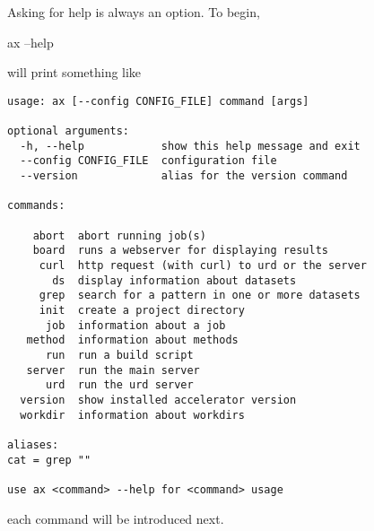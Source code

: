 Asking for help is always an option.  To begin,
\begin{shell}
ax --help
\end{shell}
will print something like
\begin{snugshade}
\begin{verbatim}
usage: ax [--config CONFIG_FILE] command [args]

optional arguments:
  -h, --help            show this help message and exit
  --config CONFIG_FILE  configuration file
  --version             alias for the version command

commands:

    abort  abort running job(s)
    board  runs a webserver for displaying results
     curl  http request (with curl) to urd or the server
       ds  display information about datasets
     grep  search for a pattern in one or more datasets
     init  create a project directory
      job  information about a job
   method  information about methods
      run  run a build script
   server  run the main server
      urd  run the urd server
  version  show installed accelerator version
  workdir  information about workdirs

aliases:
cat = grep ""

use ax <command> --help for <command> usage
\end{verbatim}
\end{snugshade}
\noindent each command will be introduced next.





